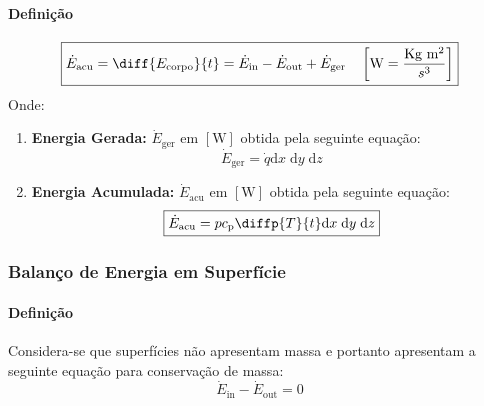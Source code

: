 \documentclass{article}
\begin{document}
            \paragraph{Definição}
                \begin{equation}
                    \boxed{
                        \dot{E}_{\text{acu}} = 
                        \diff{E_{\text{corpo}}}{t} = 
                        \dot{E}_{\text{in}} - 
                        \dot{E}_{\text{out}} + 
                        \dot{E}_{\text{ger}}
                        \quad
                        \left[
                            \text{W} = \frac{\text{Kg m\textsuperscript{2}}}{s\textsuperscript{3}}
                        \right]
                    }\label{eq:energyConservation}
                \end{equation}
            Onde:
                \begin{enumerate}[noitemsep]
                    \item \textbf{Energia Gerada:} $\dot{E}_{\text{ger}}$ em $[\text{W}]$ obtida pela seguinte equação:
                        \begin{equation}
                            \boxed{
                                \dot{E}_{\text{ger}} = \dot{q} \text{d}x\; \text{d}y\; \text{d}z
                            }
                        \end{equation}

                    \item \textbf{Energia Acumulada:} $\dot{E}_{\text{acu}}$ em $[\text{W}]$ obtida pela seguinte equação:
                        \begin{equation}
                            \boxed{
                                \dot{E}_{\text{acu}} = p c_{\text{p}} \diffp{T}{t} \text{d}x\; \text{d}y\; \text{d}z
                            }
                        \end{equation}
                \end{enumerate}

        \subsubsection{Balanço de Energia em Superfície}
            \paragraph{Definição}Considera-se que superfícies não apresentam massa e portanto apresentam a seguinte equação para conservação de massa:
                \begin{equation}
                    \boxed{
                        \dot{E}_{\text{in}} - \dot{E}_{\text{out}} = 0
                    }
                \end{equation}
\end{document}
